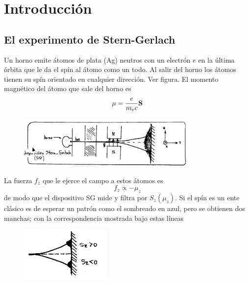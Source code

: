 \documentclass[10pt,oneside]{CBFT_book}
\begin{document}
\chapter{Introducción}


\section{El experimento de Stern-Gerlach}

Un horno emite átomos de plata (Ag) neutros con un electrón $e$ en la última órbita que le da el spín
al átomo como un todo. Al salir del horno los átomos tienen su spín orientado en cualquier dirección.
Ver figura.
El momento magnético del átomo que sale del horno es 
\[
	\vb{\mu} = \frac{e}{m_e c} \vb{S}
\]

\begin{figure}[htb]
	\begin{center}
	\includegraphics[width=0.8\textwidth]{images/teo2_1.pdf}	 
	\end{center}
	\caption{}
\end{figure} 

La fuerza $f_z$ que le ejerce el campo  a estos átomos es 
\[
	f_z \propto - \mu_z
\]
de modo que el dispositivo SG mide y filtra por $S_z(\mu_z)$. Si el spín es un ente clásico
es de esperar un patrón como el sombreado en azul, pero se obtienen dos manchas; con la
correspondencia mostrada bajo estas líneas
\begin{figure}[htb]
	\begin{center}
	\includegraphics[width=0.4\textwidth]{images/teo2_2.pdf}	 
	\end{center}
	\caption{}
\end{figure} 
\end{document}
